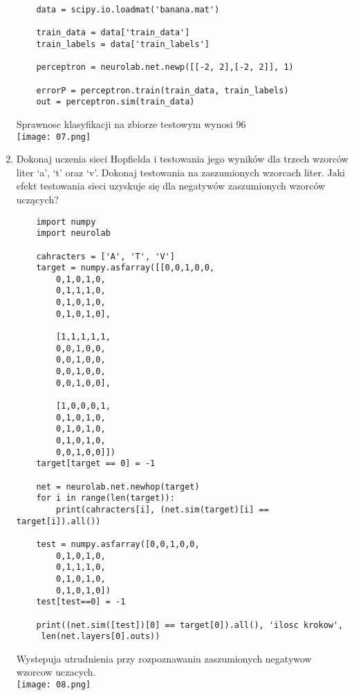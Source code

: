\documentclass[12pt,a4paper]{article}
\begin{document}
\begin{enumerate}
\begin{verbatim}
    data = scipy.io.loadmat('banana.mat')
     
    train_data = data['train_data']
    train_labels = data['train_labels']
     
    perceptron = neurolab.net.newp([[-2, 2],[-2, 2]], 1)
     
    errorP = perceptron.train(train_data, train_labels)
    out = perceptron.sim(train_data)
                    \end{verbatim}
                    Sprawnosc klasyfikacji na zbiorze testowym wynosi 96%
                    \\
                    \texttt{[image: 07.png]}
            \item Dokonaj uczenia sieci Hopfielda i testowania jego wyników dla trzech wzorców liter ‘a’, ‘t’ oraz ‘v’. Dokonaj testowania na zaszumionych wzorcach liter. Jaki efekt testowania sieci uzyskuje się dla negatywów zaszumionych wzorców uczących?
                    \begin{verbatim}
    import numpy
    import neurolab
     
    cahracters = ['A', 'T', 'V']
    target = numpy.asfarray([[0,0,1,0,0,
        0,1,0,1,0,
        0,1,1,1,0,
        0,1,0,1,0,
        0,1,0,1,0],
     
        [1,1,1,1,1,
        0,0,1,0,0,
        0,0,1,0,0,
        0,0,1,0,0,
        0,0,1,0,0],
     
        [1,0,0,0,1,
        0,1,0,1,0,
        0,1,0,1,0,
        0,1,0,1,0,
        0,0,1,0,0]])
    target[target == 0] = -1
     
    net = neurolab.net.newhop(target)
    for i in range(len(target)):
        print(cahracters[i], (net.sim(target)[i] == target[i]).all())
     
    test = numpy.asfarray([0,0,1,0,0,
        0,1,0,1,0,
        0,1,1,1,0,
        0,1,0,1,0,
        0,1,0,1,0])
    test[test==0] = -1
     
    print((net.sim([test])[0] == target[0]).all(), 'ilosc krokow',
     len(net.layers[0].outs))
                    \end{verbatim}
                Wystepuja utrudnienia przy rozpoznawaniu zaszumionych negatywow wzorcow uczacych.
                \\
                \texttt{[image: 08.png]}
        \end{enumerate}
    
\end{document}
